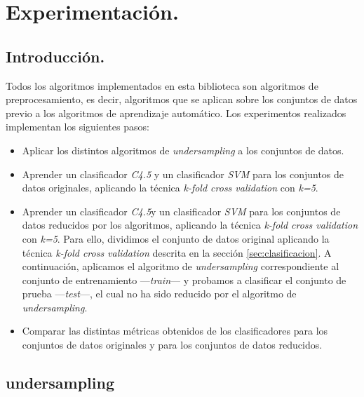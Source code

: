\chapter{Experimentación.} \label{ch:experimentacion}

\section{Introducción.} \label{sec:introduccion}

Todos los algoritmos implementados en esta biblioteca son algoritmos de preprocesamiento, es decir, algoritmos que se aplican sobre los conjuntos de datos previo a los algoritmos de aprendizaje automático. Los experimentos realizados implementan los siguientes pasos:

\begin{itemize}
	\item Aplicar los distintos algoritmos de \textit{undersampling} a los conjuntos de datos.
	\item Aprender un clasificador \textit{C4.5} \cite{c4.5} y un clasificador \textit{SVM} \cite{svm} para los conjuntos de datos originales, aplicando la técnica \textit{k-fold cross validation} con \textit{k=5}.
	\item Aprender un clasificador \textit{C4.5}y un clasificador \textit{SVM} para los conjuntos de datos reducidos por los algoritmos, aplicando la técnica \textit{k-fold cross validation} con \textit{k=5}. Para ello, dividimos el conjunto de datos original aplicando la técnica \textit{k-fold cross validation} descrita en la sección \ref{sec:clasificacion}. A continuación, aplicamos el algoritmo de \textit{undersampling} correspondiente al conjunto de entrenamiento —\textit{train}— y probamos a clasificar el conjunto de prueba —\textit{test}—, el cual no ha sido reducido por el algoritmo de \textit{undersampling}.
	\item Comparar las distintas métricas obtenidos de los clasificadores para los conjuntos de datos originales y para los conjuntos de datos reducidos.
\end{itemize}

\section{undersampling} \label{sec:undersampling}


